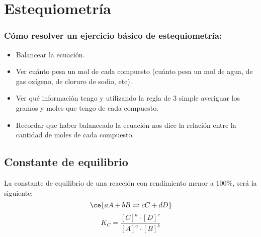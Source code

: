 \section{Estequiometría}
\subsubsection*{Cómo resolver un ejercicio básico de estequiometría:}

\begin{itemize}
    \item Balancear la ecuación.
    \item Ver cuánto pesa un mol de cada compuesto (cuánto pesa un mol de agua, de gas oxígeno, de cloruro de sodio, etc).
    \item Ver qué información tengo y utilizando la regla de 3 simple averiguar los gramos y moles que tengo de cada compuesto.
    \item Recordar que haber balanceado la ecuación nos dice la relación entre la cantidad de moles de cada compuesto.
\end{itemize}

\subsection*{Constante de equilibrio}

La constante de equilibrio de una reacción con rendimiento menor a 100\%, será la siguiente:
$$\ce{
aA + bB \rightleftharpoons cC + dD
}$$
$$
K_C = \dfrac{[C]^a \cdot [D]^c}{[A]^a\cdot [B]^b}
$$
